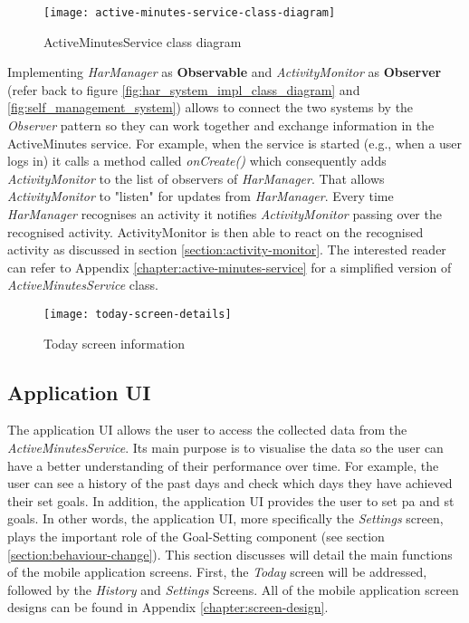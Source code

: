     \begin{figure}[ht]
    \centering
    \texttt{[image: active-minutes-service-class-diagram]}
    \caption{ActiveMinutesService class diagram}
    \label{fig:active-minutes-service-class-diagram}
    \end{figure}
    
    Implementing \textit{HarManager} as \textbf{Observable} and \textit{ActivityMonitor} as \textbf{Observer}  (refer back to figure \ref{fig:har_system_impl_class_diagram} and \ref{fig:self_management_system}) allows to connect the two systems by the \textit{Observer} pattern so they can work together and exchange information in the ActiveMinutes service. For example, when the service is started (e.g., when a user logs in) it calls a method called \textit{onCreate()} which consequently adds \textit{ActivityMonitor} to the list of observers of \textit{HarManager}. That allows \textit{ActivityMonitor} to "listen" for updates from \textit{HarManager}. Every time \textit{HarManager} recognises an activity it notifies \textit{ActivityMonitor} passing over the recognised activity. ActivityMonitor is then able to react on the recognised activity as discussed in section \ref{section:activity-monitor}. The interested reader can refer to Appendix \ref{chapter:active-minutes-service} for a simplified version of \textit{ActiveMinutesService} class.
    
    \begin{wrapfigure}[18]{R}{0.29\textwidth}
    \begin{center}
    \texttt{[image: today-screen-details]}
    \end{center}
    \caption{Today screen information}
    \label{fig:today-screen-info}
    \end{wrapfigure}
    
    
    \subsection{Application UI}
    The application UI allows the user to access the collected data from the \textit{ActiveMinutesService}. Its main purpose is to visualise the data so the user can have a better understanding of their performance over time. For example, the user can see a history of the past days and check which days they have achieved their set goals. In addition, the application UI provides the user to set \gls{pa} and \gls{st} goals. In other words, the application UI, more specifically the \textit{Settings} screen, plays the important role of the Goal-Setting component (see section \ref{section:behaviour-change}). This section discusses will detail the main functions of the mobile application screens. First, the \textit{Today} screen will be addressed, followed by the \textit{History} and \textit{Settings} Screens. All of the mobile application screen designs can be found in Appendix \ref{chapter:screen-design}.
    
